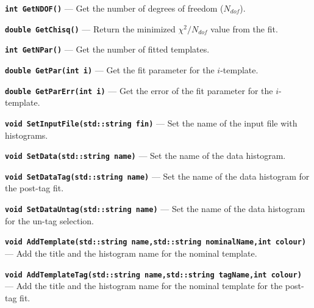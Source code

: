 \documentclass[12pt]{article}
\newcommand\verbbf[1]{\textcolor[rgb]{0,0,1}{\texttt{\textbf{#1}}}}
\begin{document}
\vspace{0.3cm}

\noindent \verbbf{int GetNDOF()} --- Get the number of degrees of freedom
($N_{dof}$).

\vspace{0.3cm}

\noindent \verbbf{double GetChisq()} --- Return the
minimized $\chi^{2}/N_{dof}$ value from the fit.

\vspace{0.3cm}

\noindent \verbbf{int GetNPar()} --- Get the number of fitted templates.

\vspace{0.3cm}

\noindent \verbbf{double GetPar(int i)} --- Get the fit parameter for
the $i$-template.

\vspace{0.3cm}

\noindent \verbbf{double GetParErr(int i)} --- Get the error of the
fit parameter for the $i$-template.

\vspace{0.3cm}

\noindent \verbbf{void SetInputFile(std::string fin)} --- Set the name
of the input file with histograms.

\vspace{0.3cm}

\noindent \verbbf{void SetData(std::string name)} --- Set the name of
the data histogram.

\vspace{0.3cm}

\noindent \verbbf{void SetDataTag(std::string name)} --- Set the name of
the data histogram for the post-tag fit.

\vspace{0.3cm}

\noindent \verbbf{void SetDataUntag(std::string name)} --- Set the name
of the data histogram for the un-tag selection.

\vspace{0.3cm}

\noindent \verbbf{void AddTemplate(std::string name,std::string
nominalName,int colour)} ---
Add the title and the histogram name for the nominal template.

\vspace{0.3cm}

\noindent \verbbf{void AddTemplateTag(std::string name,std::string
tagName,int colour)} ---
Add the title and the histogram name for the nominal template for the
post-tag fit.
\end{document}
